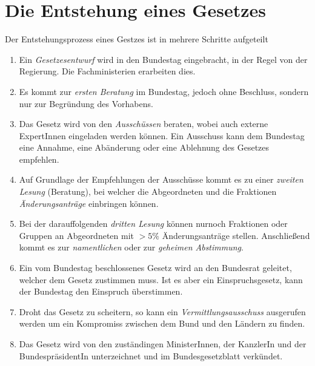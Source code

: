 \documentclass{article}
\begin{document}
\section{Die Entstehung eines Gesetzes}
Der Entstehungsprozess eines Gestzes ist in mehrere Schritte aufgeteilt
\begin{enumerate}
 \item Ein \emph{Gesetzesentwurf} wird in den Bundestag eingebracht, in der Regel von der Regierung. Die Fachministerien erarbeiten dies.
 \item Es kommt zur \emph{ersten Beratung} im Bundestag, jedoch ohne Beschluss, sondern nur zur Begründung des Vorhabens.
 \item Das Gesetz wird von den \emph{Ausschüssen} beraten, wobei auch externe ExpertInnen eingeladen werden können. Ein Ausschuss kann dem Bundestag eine Annahme, eine Abänderung oder eine Ablehnung des Gesetzes empfehlen.
 \item Auf Grundlage der Empfehlungen der Ausschüsse kommt es zu einer \emph{zweiten Lesung} (Beratung), bei welcher die Abgeordneten und die Fraktionen \emph{Änderungsanträge} einbringen können.
 \item Bei der darauffolgenden \emph{dritten Lesung} können nurnoch Fraktionen oder Gruppen an Abgeordneten mit $>5\%$ Änderungsanträge stellen. Anschließend kommt es zur \emph{namentlichen} oder zur \emph{geheimen Abstimmung}. 
 \item Ein vom Bundestag beschlossenes Gesetz wird an den Bundesrat geleitet, welcher dem Gesetz zustimmen muss. Ist es aber ein Einspruchsgesetz, kann der Bundestag den Einspruch überstimmen.
 \item Droht das Gesetz zu scheitern, so kann ein \emph{Vermittlungsausschuss} ausgerufen werden um ein Kompromiss zwischen dem Bund und den Ländern zu finden. 
 \item Das Gesetz wird von den zuständingen MinisterInnen, der KanzlerIn und der BundespräsidentIn unterzeichnet und im Bundesgesetzblatt verkündet. 
\end{enumerate} 
\end{document}
